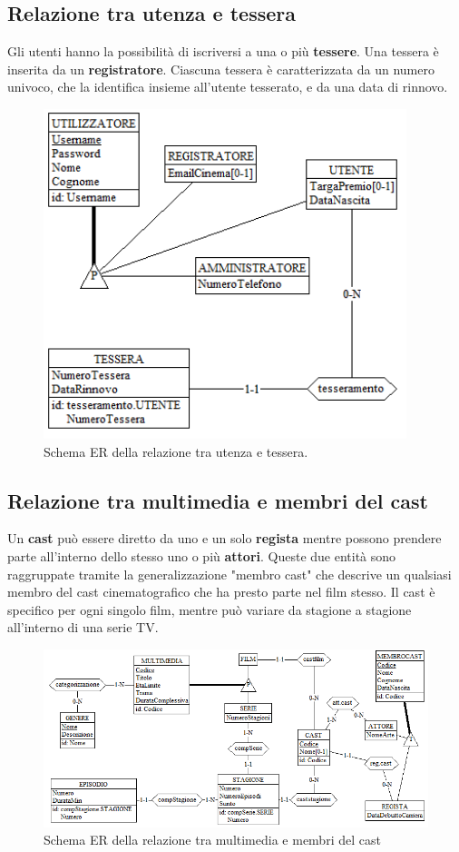 \documentclass[a4paper,12pt]{report}
\begin{document}
\subsection{Relazione tra utenza e tessera}
Gli utenti hanno la possibilità di iscriversi a una o più \textbf{tessere}. Una tessera è inserita da un \textbf{registratore}. Ciascuna tessera è caratterizzata da un numero univoco, che la identifica insieme all'utente tesserato, e da una data di rinnovo.
\begin{figure}[H]
	\centering
	\includegraphics[width=300pt]{ER/utenzatessera.png}
	\caption{Schema ER della relazione tra utenza e tessera.}
\end{figure}
\subsection{Relazione tra multimedia e membri del cast}
Un \textbf{cast} può essere diretto da uno e un solo \textbf{regista} mentre possono prendere parte all'interno dello stesso uno o più \textbf{attori}. Queste due entità sono raggruppate tramite la generalizzazione "membro cast" che descrive un qualsiasi membro del cast cinematografico che ha presto parte nel film stesso.
Il cast è specifico per ogni singolo film, mentre può variare da stagione a stagione all'interno di una serie TV.
\begin{figure}[H]
	\centering
	\includegraphics[width=350pt]{ER/multimediacast.png}
	\caption{Schema ER della relazione tra multimedia e membri del cast}
\end{figure}
\end{document}
